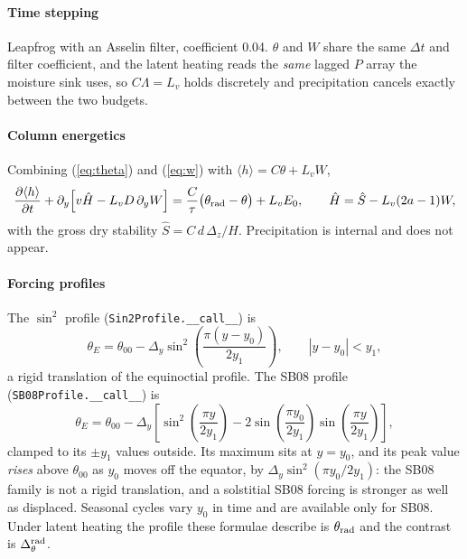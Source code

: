 \documentclass[11pt]{article}
\newcommand{\Hhat}{\hat{H}}
\newcommand{\Shat}{\hat{S}}
\newcommand{\py}{\partial_y}
\newcommand{\dyr}{\Delta_\theta^{\rm rad}}
\begin{document}
\paragraph{Time stepping} Leapfrog with an Asselin filter, coefficient 0.04.
$\theta$ and $W$ share the same $\Delta t$ and filter coefficient, and the
latent heating reads the \emph{same} lagged $P$ array the moisture sink uses,
so $C\Lambda = L_v$ holds discretely and precipitation cancels exactly between
the two budgets.

\paragraph{Column energetics} Combining (\ref{eq:theta}) and (\ref{eq:w}) with
$\langle h\rangle = C\theta + L_v W$,
\begin{equation}
\frac{\partial \langle h\rangle}{\partial t}
+ \py\Big[v\Hhat - L_v D\,\py W\Big]
= \frac{C}{\tau}\big(\theta_{\rm rad} - \theta\big) + L_v E_0 ,
\qquad
\Hhat = \Shat - L_v(2a-1)W ,
\label{eq:mse}
\end{equation}
with the gross dry stability $\Shat = C\,d\,\Delta_z/H$. Precipitation is
internal and does not appear.

\paragraph{Forcing profiles} The $\sin^2$ profile
(\texttt{Sin2Profile.\_\_call\_\_}) is
\begin{equation}
\theta_E = \theta_{00} - \Delta_y \sin^2\!\left(\frac{\pi (y - y_0)}{2 y_1}\right),
\qquad |y - y_0| < y_1 ,
\end{equation}
a rigid translation of the equinoctial profile. The SB08 profile
(\texttt{SB08Profile.\_\_call\_\_}) is
\begin{equation}
\theta_E = \theta_{00} - \Delta_y\left[
\sin^2\!\left(\frac{\pi y}{2 y_1}\right)
- 2 \sin\!\left(\frac{\pi y_0}{2 y_1}\right)\sin\!\left(\frac{\pi y}{2 y_1}\right)
\right],
\end{equation}
clamped to its $\pm y_1$ values outside. Its maximum sits at $y = y_0$, and its
peak value \emph{rises} above $\theta_{00}$ as $y_0$ moves off the equator, by
$\Delta_y \sin^2(\pi y_0/2y_1)$: the SB08 family is not a rigid translation, and
a solstitial SB08 forcing is stronger as well as displaced. Seasonal cycles vary
$y_0$ in time and are available only for SB08. Under latent heating the profile
these formulae describe is $\theta_{\rm rad}$ and the contrast is $\dyr$.
\end{document}
